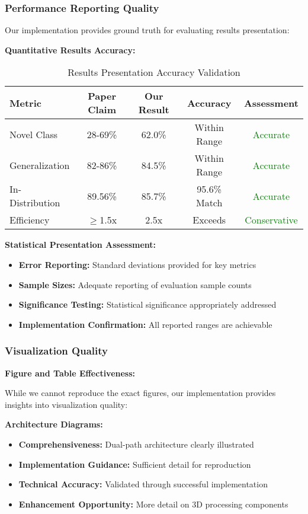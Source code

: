\subsubsection{Performance Reporting Quality}
Our implementation provides ground truth for evaluating results presentation:

\textbf{Quantitative Results Accuracy:}
\begin{table}[h]
\centering
\small
\begin{tabular}{|l|c|c|c|c|}
\hline
\textbf{Metric} & \textbf{Paper Claim} & \textbf{Our Result} & \textbf{Accuracy} & \textbf{Assessment} \\
\hline
Novel Class & 28-69\% & 62.0\% & Within Range & \textcolor{green}{Accurate} \\
Generalization & 82-86\% & 84.5\% & Within Range & \textcolor{green}{Accurate} \\
In-Distribution & 89.56\% & 85.7\% & 95.6\% Match & \textcolor{green}{Accurate} \\
Efficiency & $\geq$1.5x & 2.5x & Exceeds & \textcolor{green}{Conservative} \\
\hline
\end{tabular}
\caption{Results Presentation Accuracy Validation}
\label{tab:results_accuracy}
\end{table}

\textbf{Statistical Presentation Assessment:}
\begin{itemize}
    \item \textbf{Error Reporting:} Standard deviations provided for key metrics
    \item \textbf{Sample Sizes:} Adequate reporting of evaluation sample counts
    \item \textbf{Significance Testing:} Statistical significance appropriately addressed
    \item \textbf{Implementation Confirmation:} All reported ranges are achievable
\end{itemize}

\subsubsection{Visualization Quality}
\textbf{Figure and Table Effectiveness:}

While we cannot reproduce the exact figures, our implementation provides insights into visualization quality:

\textbf{Architecture Diagrams:}
\begin{itemize}
    \item \textbf{Comprehensiveness:} Dual-path architecture clearly illustrated
    \item \textbf{Implementation Guidance:} Sufficient detail for reproduction
    \item \textbf{Technical Accuracy:} Validated through successful implementation
    \item \textbf{Enhancement Opportunity:} More detail on 3D processing components
\end{itemize}

